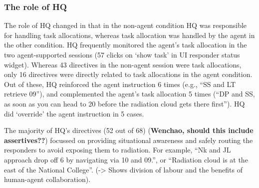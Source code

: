 \subsubsection{The role of HQ}
The role of HQ changed in that in the non-agent condition HQ was responsible for handling task allocations, whereas task allocation was handled by the agent in the other condition. HQ frequently monitored the agent's task allocation in the two agent-supported sessions (57 clicks on `show task' in UI responder status widget). Whereas 43 directives in the non-agent session were task allocations, only 16 directives were directly related to task allocations in the agent condition. Out of these, HQ reinforced the agent instruction 6 times (e.g., ``SS and LT retrieve 09''), and complemented the agent's task allocation 5 times (``DP and SS, as soon as you can head to 20 before the radiation cloud gets there first''). HQ did `override' the agent instruction in 5 cases.  

The majority of HQ's directives (52 out of 68) (\textbf{Wenchao, should this include assertives??}) focussed on providing situational awareness and safely routing the responders to avoid exposing them to radiation. For example, ``Nk and JL approach drop off 6 by navigating via 10 and 09.'', or ``Radiation cloud is at the east of the National College''. (-> Shows division of labour and the benefits of human-agent collaboration).

 
